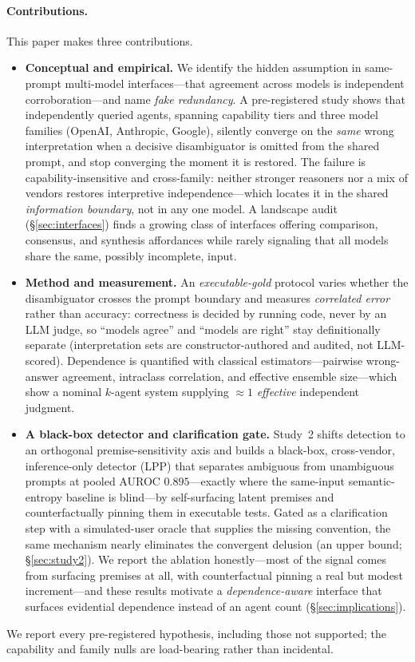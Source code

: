 \documentclass[acmsmall,screen,review,anonymous]{acmart}
\begin{document}
\paragraph{Contributions.} This paper makes three contributions.
\begin{itemize}
\item \textbf{Conceptual and empirical.} We identify the hidden assumption in same-prompt multi-model
interfaces---that agreement across models is independent corroboration---and name \emph{fake redundancy}. A
pre-registered study shows that independently queried agents, spanning capability tiers and three model
families (OpenAI, Anthropic, Google), silently converge on the \emph{same} wrong interpretation when a
decisive disambiguator is omitted from the shared prompt, and stop converging the moment it is restored.
The failure is capability-insensitive and cross-family: neither stronger reasoners nor a mix of vendors
restores interpretive independence---which locates it in the shared \emph{information boundary}, not in any
one model. A landscape audit (\S\ref{sec:interfaces}) finds a growing class of interfaces offering
comparison, consensus, and synthesis affordances while rarely signaling that all models share the same,
possibly incomplete, input.
\item \textbf{Method and measurement.} An \emph{executable-gold} protocol varies whether the disambiguator
crosses the prompt boundary and measures \emph{correlated error} rather than accuracy: correctness is
decided by running code, never by an LLM judge, so ``models agree'' and ``models are right'' stay
definitionally separate (interpretation sets are constructor-authored and audited, not LLM-scored).
Dependence is quantified with classical estimators---pairwise wrong-answer agreement, intraclass
correlation, and effective ensemble size---which show a nominal $k$-agent system supplying $\approx\!1$
\emph{effective} independent judgment.
\item \textbf{A black-box detector and clarification gate.} Study~2 shifts detection to an orthogonal
premise-sensitivity axis and builds a black-box, cross-vendor, inference-only detector (LPP) that separates
ambiguous from unambiguous prompts at pooled AUROC $0.895$---exactly where the same-input semantic-entropy
baseline is blind---by self-surfacing latent premises and counterfactually pinning them in executable tests.
Gated as a clarification step with a simulated-user oracle that supplies the missing convention, the same
mechanism nearly eliminates the convergent delusion (an upper bound; \S\ref{sec:study2}). We report the
ablation honestly---most of the signal comes from surfacing premises at all, with counterfactual pinning a
real but modest increment---and these results motivate a \emph{dependence-aware} interface that surfaces
evidential dependence instead of an agent count (\S\ref{sec:implications}).
\end{itemize}
We report every pre-registered hypothesis, including those not supported; the capability and family nulls
are load-bearing rather than incidental.
\end{document}

